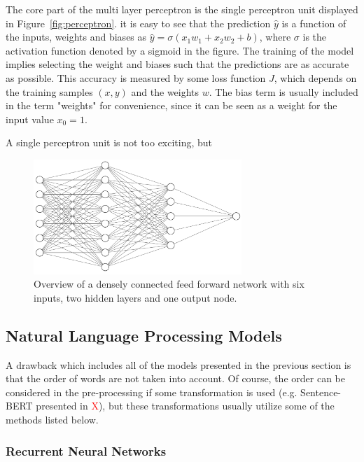 The core part of the multi layer perceptron is the single perceptron unit displayed in Figure~\ref{fig:perceptron}. it is easy to see that the prediction $\hat{y}$ is a function of the inputs, weights and biases as $\hat{y} = \sigma(x_1 w_1 + x_2 w_2 + b)$, where $\sigma$ is the activation function denoted by a sigmoid in the figure. The training of the model implies selecting the weight and biases such that the predictions are as accurate as possible. This accuracy is measured by some loss function $J$, which depends on the training samples $(x,y)$ and the weights $w$. The bias term is usually included in the term "weights" for convenience, since it can be seen as a weight for the input value $x_0 = 1$.

A single perceptron unit is not too exciting, but 


\begin{figure}[H]
    \centering
    \includegraphics[width=0.7\textwidth]{Figures/ff.PNG}
    \caption{Overview of a densely connected feed forward network with six inputs, two hidden layers and one output node.}
    \label{fig:mlp}
\end{figure}

\subsection{Natural Language Processing Models}\label{sec:nlpmod}

A drawback which includes all of the models presented in the previous section is that the order of words are not taken into account. Of course, the order can be considered in the pre-processing if some transformation is used (e.g. Sentence-BERT presented in \textcolor{red}{X}), but these transformations usually utilize some of the methods listed below. 

\subsubsection{Recurrent Neural Networks}


